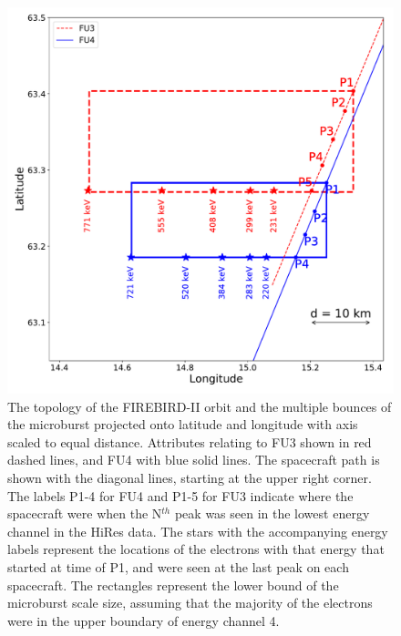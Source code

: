 \documentclass[draft, linenumbers]{agujournal}
\begin{document}
\begin{figure}
\includegraphics[width=\textwidth]{decay_microburst_distance_corrected_CH4_last_pk_drift_color_3.pdf}
\caption{The topology of the FIREBIRD-II orbit and the multiple bounces of the microburst projected onto latitude and longitude with axis scaled to equal distance. Attributes relating to FU3 shown in red dashed lines, and FU4 with blue solid lines. The spacecraft path is shown with the diagonal lines, starting at the upper right corner. The labels P1-4 for FU4 and P1-5 for FU3 indicate where the spacecraft were when the N$^{th}$ peak was seen in the lowest energy channel in the HiRes data. The stars with the accompanying energy labels represent the locations of the electrons with that energy that started at time of P1, and were seen at the last peak on each spacecraft. The rectangles represent the lower bound of the microburst scale size, assuming that the majority of the electrons were in the upper boundary of energy channel 4.}
\label{map_plot}
\end{figure}


\end{document}
